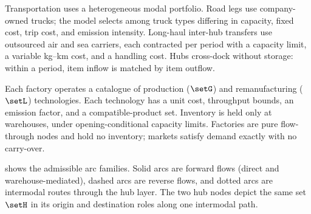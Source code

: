 Transportation uses a heterogeneous modal portfolio. Road legs use
company-owned trucks; the model selects among truck types differing in
capacity, fixed cost, trip cost, and emission intensity. Long-haul
inter-hub transfers use outsourced air and sea carriers, each contracted
per period with a capacity limit, a variable kg--km cost, and a handling
cost. Hubs cross-dock without storage: within a period, item inflow is
matched by item outflow.

Each factory operates a catalogue of production ($\setG$) and
remanufacturing ($\setL$) technologies. Each technology has a unit cost,
throughput bounds, an emission factor, and a compatible-product set.
Inventory is held only at warehouses, under opening-conditional capacity
limits. Factories are pure flow-through nodes and hold no inventory;
markets satisfy demand exactly with no carry-over.

 shows the admissible arc families. Solid
arcs are forward flows (direct and warehouse-mediated), dashed arcs are
reverse flows, and dotted arcs are intermodal routes through the hub
layer. The two hub nodes depict the same set $\setH$ in its origin and
destination roles along one intermodal path.

